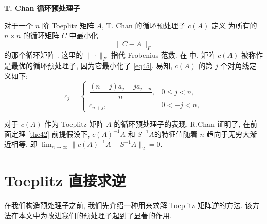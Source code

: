\documentclass{ecnumaster}
\begin{document}

\medskip
\noindent\textbf{T. Chan 循环预处理子}

对于一个 $n$ 阶 Toeplitz 矩阵 $A$, T. Chan 的循环预处理子 $c(A)$ 定义
为所有的 $n \times n$ 的循环矩阵 $C$ 中最小化
\begin{equation}\label{eq45}
  \| C - A \|_F
\end{equation}
的那个循环矩阵 \cite{C88}.
这里的 $\| \cdot \|_F$ 指代 Frobenius 范数.
在 \cite{C88} 中, 矩阵 $c(A)$ 被称作是最优的循环预处理子,
因为它最小化了 \eqref{eq45}.
易知, $c(A)$ 的第 $j$ 个对角线定义如下:
\begin{equation}
  c_j =
  \begin{cases}
    \dfrac{(n-j)a_j + ja_{j-n}}{n}, & 0 \leq j < n,\\
    c_{n+j}, & 0 < -j < n,
  \end{cases}
\end{equation}

对于 $c(A)$ 作为 Toeplitz 矩阵 $A$ 的循环预处理子的表现,
R.Chan \cite{C890} 证明了,
在前面定理 \ref{the42} 前提假设下,
$c(A)^{-1}A$ 和 $S^{-1}A$的特征值随着 $n$ 趋向于无穷大渐近相等,
即 $\lim_{n\to \infty} \| c(A)^{-1}A - S^{-1}A \|_2 = 0$.

\section{Toeplitz 直接求逆}
在我们构造预处理子之前,
我们先介绍一种用来求解 Toeplitz 矩阵逆的方法.
该方法在本文中为改进我们的预处理子起到了显著的作用.

\end{document}
